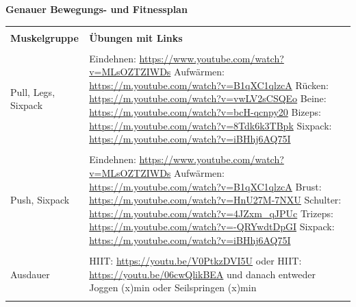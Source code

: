 \newline
\pagebreak
\newline
\textbf{Genauer Bewegungs- und Fitnessplan}
\newline
\begin{table}[htp]
  \begin{tabularx}{\textwidth}{l X}\hline \\
    \textbf{Muskelgruppe} & \textbf{Übungen mit Links}  \\\hline \\
    Pull, Legs, Sixpack & Eindehnen: \url{https://www.youtube.com/watch?v=MLsOZTZIWDs}
    \newline
    Aufwärmen: \url{https://m.youtube.com/watch?v=B1qXC1qlzcA}
    \newline
    Rücken: \url{https://m.youtube.com/watch?v=vwLV2sCSQEo}
    \newline
    Beine: \url{https://m.youtube.com/watch?v=bcH-qcnpy20}
    \newline
    Bizeps: \url{https://m.youtube.com/watch?v=8Tdk6k3TBpk}
    \newline
    Sixpack: \url{https://m.youtube.com/watch?v=iBHhj6AQ75I} \\ \\
    Push, Sixpack & Eindehnen: \url{https://www.youtube.com/watch?v=MLsOZTZIWDs}
    \newline
    Aufwärmen: \url{https://m.youtube.com/watch?v=B1qXC1qlzcA}
    \newline
    Brust: \url{https://m.youtube.com/watch?v=HnU27M-7NXU}
    \newline
    Schulter: \url{https://m.youtube.com/watch?v=4JZxm_qJPUc}
    \newline
    Trizeps: \url{https://m.youtube.com/watch?v=-QRYwdtDpGI}
    \newline
    Sixpack: \url{https://m.youtube.com/watch?v=iBHhj6AQ75I} \\ \\
    Ausdauer & HIIT: \url{https://youtu.be/V0PtkzDVI5U}
    \newline
    oder
    \newline
    HIIT: \url{https://youtu.be/06cwQlikBEA}
    \newline
    und danach entweder Joggen (x)min oder Seilspringen (x)min \\
    \\\hline
  \end{tabularx}
\end{table}
